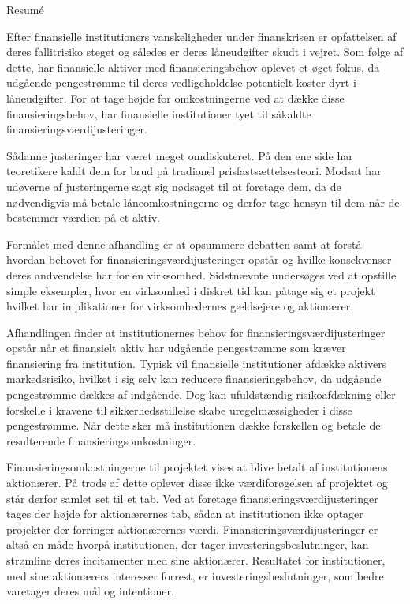 \documentclass[main.tex]{subfiles}
\begin{document}
    \thispagestyle{empty}
    \begin{adjustwidth}{-1cm}{-1cm}
    \begin{center}
    {\LARGE Resumé}
    \end{center}

    Efter finansielle institutioners vanskeligheder under finanskrisen 
    er opfattelsen af deres fallitrisiko steget og således er deres låneudgifter skudt i vejret.
    Som følge af dette, har finansielle aktiver med finansieringsbehov oplevet et øget fokus, 
    da udgående pengestrømme til deres vedligeholdelse potentielt koster dyrt i låneudgifter.
    For at tage højde for omkostningerne ved at dække disse finansieringsbehov,
    har finansielle institutioner tyet til såkaldte finansieringsværdijusteringer.

    Sådanne justeringer har været meget omdiskuteret. 
    På den ene side har teoretikere kaldt dem for brud på tradionel prisfastsættelsesteori.
    Modsat har udøverne af justeringerne sagt sig nødsaget til at foretage dem,
    da de nødvendigvis må betale låneomkostningerne 
    og derfor tage hensyn til dem når de bestemmer værdien på et aktiv. 

    Formålet med denne afhandling er at opsummere debatten
    samt at forstå hvordan behovet for finansieringsværdijusteringer opstår 
    og hvilke konsekvenser deres andvendelse har for en virksomhed.
    Sidstnævnte undersøges ved at opstille simple eksempler,
    hvor en virksomhed i diskret tid kan påtage sig et projekt
    hvilket har implikationer for virksomhedernes gældsejere og aktionærer.

    Afhandlingen finder at institutionernes behov for finansieringsværdijusteringer opstår 
    når et finansielt aktiv har udgående pengestrømme som kræver finansiering fra institution.
    Typisk vil finansielle institutioner afdække aktivers markedsrisiko,
    hvilket i sig selv kan reducere finansieringsbehov, da udgående pengestrømme dækkes af indgående.
    Dog kan ufuldstændig risikoafdækning eller forskelle i kravene til sikkerhedsstillelse
    skabe uregelmæssigheder i disse pengestrømme. 
    Når dette sker må institutionen dække forskellen 
    og betale de resulterende finansieringsomkostninger.
    
    Finansieringsomkostningerne til projektet vises at blive betalt af institutionens aktionærer.
    På trods af dette oplever disse ikke værdiforøgelsen af projektet
    og står derfor samlet set til et tab.
    Ved at foretage finansieringsværdijusteringer tages der højde for aktionærernes tab,
    sådan at institutionen ikke optager projekter der forringer aktionærernes værdi.
    Finansieringsværdijusteringer er altså en måde hvorpå institutionen, 
    der tager investeringsbeslutninger, kan strømline deres incitamenter med sine aktionærer. 
    Resultatet for institutioner, med sine aktionærers interesser forrest,
    er investeringsbeslutninger, som bedre varetager deres mål og intentioner.
    
    \end{adjustwidth}
\end{document}
